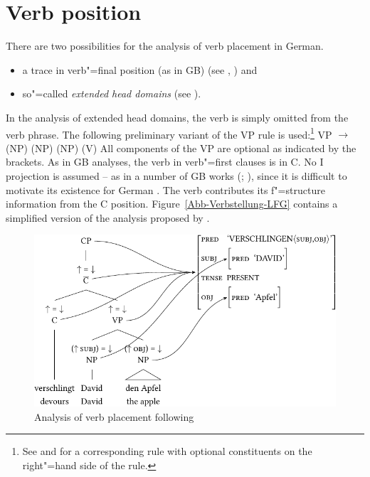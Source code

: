 \section{Verb position}
\label{Abschnitt-Verbstellung-LFG}

There are two possibilities for the analysis of verb placement in German.
\begin{sloppypar}
\begin{itemize}
\item a trace in verb"=final position (as in GB\indexgb) (see \citealp{Choi99a-u}, \citealp[Section~2.1.4]{Berman96a-u}) and
\item so"=called \emph{extended head domains}
  (see \citealp{Berman2003a}).
\end{itemize}
\end{sloppypar}

\noindent
In the analysis of extended head domains, the verb is simply omitted from the verb phrase. The following preliminary variant of the VP rule is used:\footnote{
See  and  for a corresponding rule with optional constituents on the right"=hand side of the rule.
}
\ea
\label{Regel-LFG-VP-alles-optional}
VP $\to$ (NP) (NP) (NP) (V)
\z
All components of the VP are optional as indicated by the brackets. As in GB analyses, the verb in
verb"=first clauses is in C. No I projection is assumed -- as in a number of GB works 
(\citealp{Haider93a,Haider95b-u,Haider97a}; \citealp[Section~IV.3]{Sternefeld2006a-u}), since it is difficult to motivate its existence for German
\citep[Section~3.2.2]{Berman2003a}. The verb contributes its f"=structure information from the C position. Figure~\vref{Abb-Verbstellung-LFG} contains a simplified version of the
analysis proposed by \citet[]{Berman2003a}.
 
\begin{figure}
\centerline{%
\includegraphics{Figures/verschlingt-david-den-apfel-lfg-lsp-crop}
}
\caption{\label{Abb-Verbstellung-LFG}Analysis of verb placement following \citet[]{Berman2003a}}
\end{figure}%

